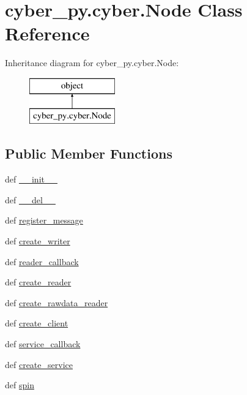 \hypertarget{classcyber__py_1_1cyber_1_1Node}{\section{cyber\-\_\-py.\-cyber.\-Node Class Reference}
\label{classcyber__py_1_1cyber_1_1Node}
}
Inheritance diagram for cyber\-\_\-py.\-cyber.\-Node\-:\begin{figure}[H]
\begin{center}
\leavevmode
\includegraphics[height=2.000000cm]{classcyber__py_1_1cyber_1_1Node}
\end{center}
\end{figure}
\subsection*{Public Member Functions}
\begin{DoxyCompactItemize}
\item 
def \hyperlink{classcyber__py_1_1cyber_1_1Node_a7ed5cbe9188a3e758e9e3d25ac375d7c}{\-\_\-\-\_\-init\-\_\-\-\_\-}
\item 
def \hyperlink{classcyber__py_1_1cyber_1_1Node_ab458e2836cf1ddff40e94b9ac4552da2}{\-\_\-\-\_\-del\-\_\-\-\_\-}
\item 
def \hyperlink{classcyber__py_1_1cyber_1_1Node_a114d1b9766de4aa0d51507e3f15896ec}{register\-\_\-message}
\item 
def \hyperlink{classcyber__py_1_1cyber_1_1Node_a04929ca39d6ab0a6ce9a7464da05bdf4}{create\-\_\-writer}
\item 
def \hyperlink{classcyber__py_1_1cyber_1_1Node_aeb4ffff77bb79bed4c88c2f339dc354b}{reader\-\_\-callback}
\item 
def \hyperlink{classcyber__py_1_1cyber_1_1Node_ae688186c7437c468d97200d1c8e6c461}{create\-\_\-reader}
\item 
def \hyperlink{classcyber__py_1_1cyber_1_1Node_aee11e90886abf9459fe2424f49e8a3fb}{create\-\_\-rawdata\-\_\-reader}
\item 
def \hyperlink{classcyber__py_1_1cyber_1_1Node_a66ba57a5a8eeeb7a3951e278d59dc73b}{create\-\_\-client}
\item 
def \hyperlink{classcyber__py_1_1cyber_1_1Node_a83d825faba3823b920a8351639819d7a}{service\-\_\-callback}
\item 
def \hyperlink{classcyber__py_1_1cyber_1_1Node_a462c5baf7e7865e3748444f9bc25d1a3}{create\-\_\-service}
\item 
def \hyperlink{classcyber__py_1_1cyber_1_1Node_aa84f141f87c59573e91b7e475eda24cb}{spin}
\end{DoxyCompactItemize}
